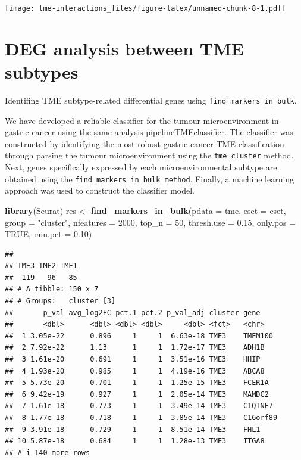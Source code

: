 \documentclass[
  12pt,
]{book}
\newenvironment{Shaded}{\begin{snugshade}}{\end{snugshade}}
\newcommand{\AttributeTok}[1]{\textcolor[rgb]{0.13,0.29,0.53}{#1}}
\newcommand{\ConstantTok}[1]{\textcolor[rgb]{0.56,0.35,0.01}{#1}}
\newcommand{\DecValTok}[1]{\textcolor[rgb]{0.00,0.00,0.81}{#1}}
\newcommand{\FloatTok}[1]{\textcolor[rgb]{0.00,0.00,0.81}{#1}}
\newcommand{\FunctionTok}[1]{\textcolor[rgb]{0.13,0.29,0.53}{\textbf{#1}}}
\newcommand{\NormalTok}[1]{#1}
\newcommand{\OtherTok}[1]{\textcolor[rgb]{0.56,0.35,0.01}{#1}}
\newcommand{\StringTok}[1]{\textcolor[rgb]{0.31,0.60,0.02}{#1}}
\begin{document}
\texttt{[image: tme-interactions\_files/figure-latex/unnamed-chunk-8-1.pdf]}

\hypertarget{deg-analysis-between-tme-subtypes}{%
\section{DEG analysis between TME subtypes}\label{deg-analysis-between-tme-subtypes}}

Identifing TME subtype-related differential genes using \texttt{find\_markers\_in\_bulk}.

We have developed a reliable classifier for the tumour microenvironment in gastric cancer using the same analysis pipeline\href{https://github.com/LiaoWJLab/TMEclassifier}{TMEclassifier}. The classifier was constructed by identifying the most robust gastric cancer TME classification through parsing the tumour microenvironment using the \texttt{tme\_cluster} method. Next, genes specifically expressed by each microenvironmental subtype are obtained using the \texttt{find\_markers\_in\_bulk\ method}. Finally, a machine learning approach was used to construct the classifier model.

\begin{Shaded}
\begin{Highlighting}[]
\FunctionTok{library}\NormalTok{(Seurat)}
\NormalTok{res }\OtherTok{\textless{}{-}} \FunctionTok{find\_markers\_in\_bulk}\NormalTok{(}\AttributeTok{pdata      =}\NormalTok{ tme, }
                            \AttributeTok{eset       =}\NormalTok{ eset, }
                            \AttributeTok{group      =} \StringTok{"cluster"}\NormalTok{, }
                            \AttributeTok{nfeatures  =} \DecValTok{2000}\NormalTok{, }
                            \AttributeTok{top\_n      =} \DecValTok{50}\NormalTok{, }
                            \AttributeTok{thresh.use =} \FloatTok{0.15}\NormalTok{, }
                            \AttributeTok{only.pos   =} \ConstantTok{TRUE}\NormalTok{, }
                            \AttributeTok{min.pct    =} \FloatTok{0.10}\NormalTok{)}
\end{Highlighting}
\end{Shaded}

\begin{verbatim}
## 
## TME3 TME2 TME1 
##  119   96   85 
## # A tibble: 150 x 7
## # Groups:   cluster [3]
##       p_val avg_log2FC pct.1 pct.2 p_val_adj cluster gene    
##       <dbl>      <dbl> <dbl> <dbl>     <dbl> <fct>   <chr>   
##  1 3.05e-22      0.896     1     1  6.63e-18 TME3    TMEM100 
##  2 7.92e-22      1.13      1     1  1.72e-17 TME3    ADH1B   
##  3 1.61e-20      0.691     1     1  3.51e-16 TME3    HHIP    
##  4 1.93e-20      0.985     1     1  4.19e-16 TME3    ABCA8   
##  5 5.73e-20      0.701     1     1  1.25e-15 TME3    FCER1A  
##  6 9.42e-19      0.927     1     1  2.05e-14 TME3    MAMDC2  
##  7 1.61e-18      0.773     1     1  3.49e-14 TME3    C1QTNF7 
##  8 1.77e-18      0.718     1     1  3.85e-14 TME3    C16orf89
##  9 3.91e-18      0.729     1     1  8.51e-14 TME3    FHL1    
## 10 5.87e-18      0.684     1     1  1.28e-13 TME3    ITGA8   
## # i 140 more rows
\end{verbatim}
\end{document}
